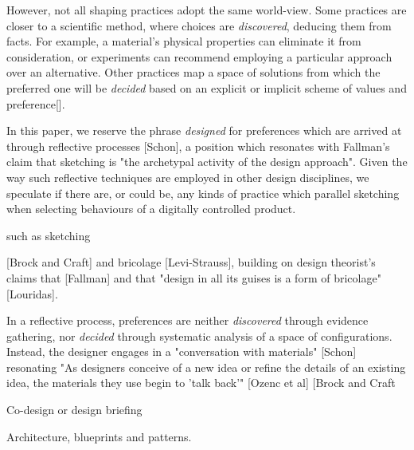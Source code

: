 \documentclass{chi-ext}
\begin{document}
However, not all shaping practices adopt the same world-view. Some practices are closer to a scientific method, where choices are \emph{discovered}, deducing them from facts. For example,  a material's physical properties can eliminate it from consideration, or experiments can recommend employing a particular approach over an alternative. Other practices map a space of solutions from which the preferred one will be \emph{decided} based on an explicit or implicit scheme of values and preference[]. 

In this paper, we reserve the phrase \emph{designed} for preferences which are arrived at through reflective processes [Schon], a position which resonates with Fallman's claim that sketching is "the archetypal activity of the design approach". Given the way such reflective techniques are employed in other design disciplines, we speculate if there are, or could be, any kinds of practice which parallel sketching when selecting behaviours of a digitally controlled product.

 such as sketching 

[Brock and Craft] and bricolage [Levi-Strauss], building on design theorist's claims that  [Fallman] and that "design in all its guises is a form of bricolage"[Louridas].

In a reflective process, preferences are neither \emph{discovered} through evidence gathering, nor \emph{decided} through systematic analysis of a space of configurations. Instead, the designer engages in a "conversation with materials" [Schon] resonating  "As designers conceive of a new idea or refine the details of an existing idea, the materials they use begin to 'talk back'" [Ozenc et al] [Brock and Craft

Co-design or design briefing

Architecture, blueprints and patterns.

\end{document}
